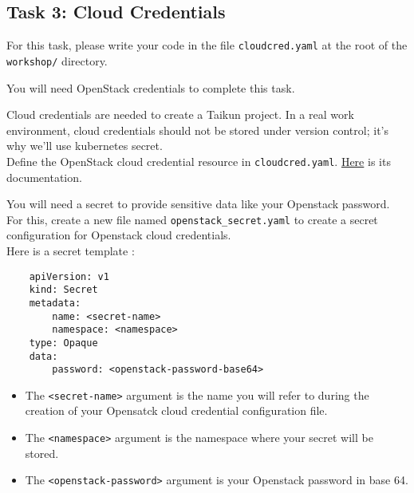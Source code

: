 \subsection{Task 3: Cloud Credentials}\label{sec:cloudcred}

\begin{note}
For this task, please write your code in the file \texttt{cloudcred.yaml}
at the root of the \texttt{workshop/} directory.\\
\end{note}

\begin{warn}
You will need OpenStack credentials to complete this task.
\end{warn}

Cloud credentials are needed to create a Taikun project.
In a real work environment,
cloud credentials should not be stored under version control;
it's why we'll use kubernetes secret.\\

Define the OpenStack cloud credential resource in \texttt{cloudcred.yaml}.
 \href{https://github.com/nivraph/provider-jet-taikun/blob/main/docs/cloudcredential.taikun.jet.crossplane.io.md}{Here} is its documentation.

You will need a secret to provide sensitive data like your Openstack password.
For this, create a new file named \texttt{openstack\_secret.yaml} to create a secret 
configuration for Openstack cloud credentials.\\

Here is a secret template :
\begin{verbatim}
    apiVersion: v1
    kind: Secret
    metadata:
        name: <secret-name>
        namespace: <namespace>
    type: Opaque
    data:
        password: <openstack-password-base64>
\end{verbatim}

\begin{itemize}
    \item The \texttt{<secret-name>} argument is the name you will refer to during 
    the creation of your Opensatck cloud credential configuration file.
    \item The \texttt{<namespace>} argument is the namespace where your secret will
     be stored.
    \item The \texttt{<openstack-password>} argument is your Openstack password in 
    base 64.
\end{itemize}


